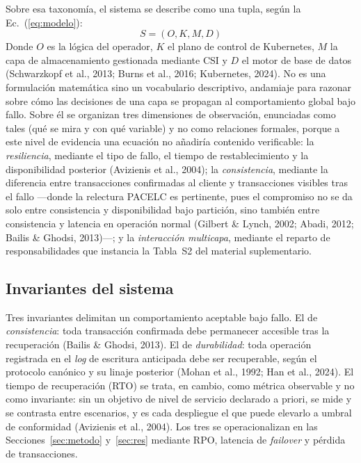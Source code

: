 \documentclass[12pt,twocolumn,letterpaper]{article}
\newcommand{\Ec}[1]{Ec.~(\ref{#1})}
\begin{document}
Sobre esa taxonomía, el sistema se describe como una tupla, según la \Ec{eq:modelo}:
\begin{equation}\label{eq:modelo}
S = (O, K, M, D)
\end{equation}
Donde $O$ es la lógica del operador, $K$ el plano de control de Kubernetes, $M$ la capa de almacenamiento gestionada mediante CSI y $D$ el motor de base de datos (Schwarzkopf et al., 2013; Burns et al., 2016; Kubernetes, 2024). No es una formulación matemática sino un vocabulario descriptivo, andamiaje para razonar sobre cómo las decisiones de una capa se propagan al comportamiento global bajo fallo. Sobre él se organizan tres dimensiones de observación, enunciadas como tales  (qué se mira y con qué variable) y no como relaciones formales, porque a este nivel de evidencia una ecuación no añadiría contenido verificable: la \textit{resiliencia}, mediante el tipo de fallo, el tiempo de restablecimiento y la disponibilidad posterior (Avizienis et al., 2004); la \textit{consistencia}, mediante la diferencia entre transacciones confirmadas al cliente y transacciones visibles tras el fallo —donde la relectura PACELC es pertinente, pues el compromiso no se da solo entre consistencia y disponibilidad bajo partición, sino también entre consistencia y latencia en operación normal (Gilbert \& Lynch, 2002; Abadi, 2012; Bailis \& Ghodsi, 2013)—; y la \textit{interacción multicapa}, mediante el reparto de responsabilidades que instancia la Tabla~S2 del material suplementario.

\subsection{Invariantes del sistema}\label{sec:inv}
Tres invariantes delimitan un comportamiento aceptable bajo fallo. El de \textit{consistencia}: toda transacción confirmada debe permanecer accesible tras la recuperación (Bailis \& Ghodsi, 2013). El de \textit{durabilidad}: toda operación registrada en el \textit{log} de escritura anticipada debe ser recuperable, según el protocolo canónico y su linaje posterior (Mohan et al., 1992; Han et al., 2024). El tiempo de recuperación (RTO) se trata, en cambio, como métrica observable y no como invariante: sin un objetivo de nivel de servicio declarado a priori, se mide y se contrasta entre escenarios, y es cada despliegue el que puede elevarlo a umbral de conformidad (Avizienis et al., 2004). Los tres se operacionalizan en las Secciones~\ref{sec:metodo} y~\ref{sec:res} mediante RPO, latencia de \textit{failover} y pérdida de transacciones.
\end{document}
